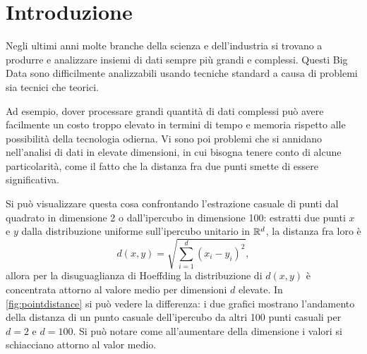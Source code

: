 \chapter{Introduzione}\label{ch:introduction}

Negli ultimi anni molte branche della scienza e dell'industria si trovano a produrre e analizzare insiemi di dati sempre più grandi e complessi. Questi Big Data sono difficilmente analizzabili usando tecniche standard a causa di problemi sia tecnici che teorici.

Ad esempio, dover processare grandi quantità di dati complessi può avere facilmente un costo troppo elevato in termini di tempo e memoria rispetto alle possibilità della tecnologia odierna. Vi sono poi problemi che si annidano nell'analisi di dati in elevate dimensioni, in cui bisogna tenere conto di alcune particolarità, come il fatto che la distanza fra due punti smette di essere significativa.

Si può visualizzare questa cosa confrontando l'estrazione casuale di punti dal quadrato in dimensione 2 o dall'ipercubo in dimensione 100: estratti due punti $x$ e $y$ dalla distribuzione uniforme sull'ipercubo unitario in $\mathbb{R}^d$, la distanza fra loro è
\begin{equation*}
  d(x,y) = \sqrt{\sum_{i=1}^d (x_i - y_i)^2},
\end{equation*}
allora per la disuguaglianza di Hoeffding la distribuzione di $d(x,y)$ è concentrata attorno al valore medio per dimensioni $d$ elevate. In \cref{fig:pointdistance} si può vedere la differenza: i due grafici mostrano l'andamento della distanza di un punto casuale dell'ipercubo da altri 100 punti casuali per $d=2$ e $d=100$. Si può notare come all'aumentare della dimensione i valori si schiacciano attorno al valor medio.

